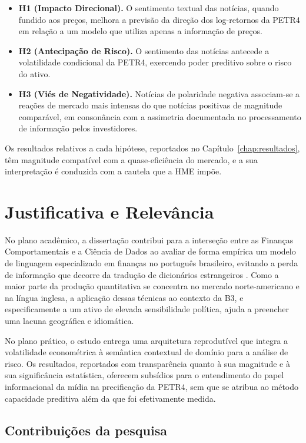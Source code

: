 \begin{itemize}
    \item \textbf{H1 (Impacto Direcional).} O sentimento textual das notícias, quando fundido aos preços, melhora a previsão da direção dos log-retornos da PETR4 em relação a um modelo que utiliza apenas a informação de preços.
    \item \textbf{H2 (Antecipação de Risco).} O sentimento das notícias antecede a volatilidade condicional da PETR4, exercendo poder preditivo sobre o risco do ativo.
    \item \textbf{H3 (Viés de Negatividade).} Notícias de polaridade negativa associam-se a reações de mercado mais intensas do que notícias positivas de magnitude comparável, em consonância com a assimetria documentada no processamento de informação pelos investidores.
\end{itemize}

Os resultados relativos a cada hipótese, reportados no Capítulo~\ref{chap:resultados}, têm magnitude compatível com a quase-eficiência do mercado, e a sua interpretação é conduzida com a cautela que a HME impõe.

\section{Justificativa e Relevância}

No plano acadêmico, a dissertação contribui para a interseção entre as Finanças Comportamentais e a Ciência de Dados ao avaliar de forma empírica um modelo de linguagem especializado em finanças no português brasileiro, evitando a perda de informação que decorre da tradução de dicionários estrangeiros \cite{henrique_literature_2019}. Como a maior parte da produção quantitativa se concentra no mercado norte-americano e na língua inglesa, a aplicação dessas técnicas ao contexto da B3, e especificamente a um ativo de elevada sensibilidade política, ajuda a preencher uma lacuna geográfica e idiomática.

No plano prático, o estudo entrega uma arquitetura reprodutível que integra a volatilidade econométrica à semântica contextual de domínio para a análise de risco. Os resultados, reportados com transparência quanto à sua magnitude e à sua significância estatística, oferecem subsídios para o entendimento do papel informacional da mídia na precificação da PETR4, sem que se atribua ao método capacidade preditiva além da que foi efetivamente medida.

\subsection{Contribuições da pesquisa}

